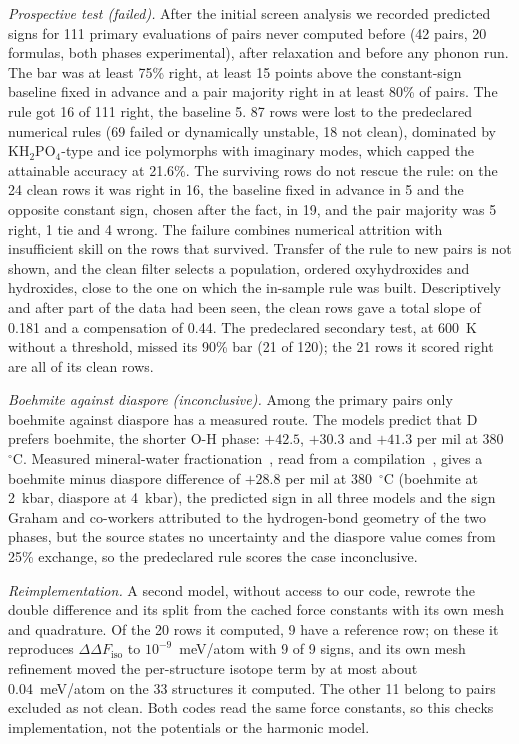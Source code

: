 \documentclass[aps,prmaterials,reprint,superscriptaddress,nofootinbib]{revtex4-2}
\newcommand{\ddF}{\Delta\Delta F_{\mathrm{iso}}}
\begin{document}
\textit{Prospective test (failed).} After the initial screen analysis we recorded predicted signs for 111 primary evaluations of pairs never computed before (42 pairs, 20 formulas, both phases experimental), after relaxation and before any phonon run. The bar was at least 75\% right, at least 15 points above the constant-sign baseline fixed in advance and a pair majority right in at least 80\% of pairs. The rule got 16 of 111 right, the baseline 5. 87 rows were lost to the predeclared numerical rules (69 failed or dynamically unstable, 18 not clean), dominated by KH$_2$PO$_4$-type and ice polymorphs with imaginary modes, which capped the attainable accuracy at 21.6\%. The surviving rows do not rescue the rule: on the 24 clean rows it was right in 16, the baseline fixed in advance in 5 and the opposite constant sign, chosen after the fact, in 19, and the pair majority was 5 right, 1 tie and 4 wrong. The failure combines numerical attrition with insufficient skill on the rows that survived. Transfer of the rule to new pairs is not shown, and the clean filter selects a population, ordered oxyhydroxides and hydroxides, close to the one on which the in-sample rule was built. Descriptively and after part of the data had been seen, the clean rows gave a total slope of 0.181 and a compensation of 0.44. The predeclared secondary test, at 600~K without a threshold, missed its 90\% bar (21 of 120); the 21 rows it scored right are all of its clean rows.

\textit{Boehmite against diaspore (inconclusive).} Among the primary pairs only boehmite against diaspore has a measured route. The models predict that D prefers boehmite, the shorter O-H phase: $+42.5$, $+30.3$ and $+41.3$ per mil at 380~$^\circ$C. Measured mineral-water fractionation~\cite{Graham1980}, read from a compilation~\cite{Chacko2001}, gives a boehmite minus diaspore difference of $+28.8$ per mil at 380~$^\circ$C (boehmite at 2~kbar, diaspore at 4~kbar), the predicted sign in all three models and the sign Graham and co-workers attributed to the hydrogen-bond geometry of the two phases, but the source states no uncertainty and the diaspore value comes from 25\% exchange, so the predeclared rule scores the case inconclusive.

\textit{Reimplementation.} A second model, without access to our code, rewrote the double difference and its split from the cached force constants with its own mesh and quadrature. Of the 20 rows it computed, 9 have a reference row; on these it reproduces $\ddF$ to $10^{-9}$~meV/atom with 9 of 9 signs, and its own mesh refinement moved the per-structure isotope term by at most about 0.04~meV/atom on the 33 structures it computed. The other 11 belong to pairs excluded as not clean. Both codes read the same force constants, so this checks implementation, not the potentials or the harmonic model.
\end{document}
